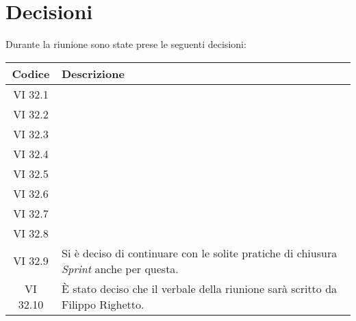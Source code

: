 
\section{Decisioni}

Durante la riunione sono state prese le seguenti decisioni:

\vspace{0.5cm}

\begin{table}[htbp]
    \centering
    \begin{tabular}{|c|p{}|}
        \hline
        \rowcolor[gray]{0.75}
        \textbf{Codice} & \textbf{Descrizione}\\
        \hline
        VI 32.1 & \\
        \hline
        VI 32.2 & \\
        \hline
        VI 32.3 & \\
        \hline 
        VI 32.4 & \\
        \hline
        VI 32.5 & \\
        \hline
        VI 32.6 & \\
        \hline
        VI 32.7 & \\
        \hline
        VI 32.8 & \\
        \hline
        VI 32.9 & Si è deciso di continuare con le solite pratiche di chiusura \emph{Sprint} anche per questa. \\
        \hline
        VI 32.10 & È stato deciso che il verbale della riunione sarà scritto da Filippo Righetto. \\
        \hline
    \end{tabular}
\end{table}
